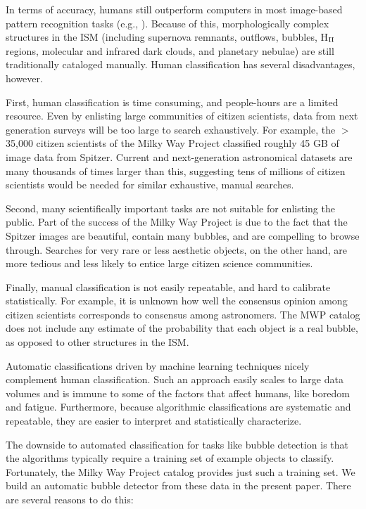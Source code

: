 \documentclass[preprint]{aastex}
\newcommand{\hii}[0]{H$_{\rm II}$}
\begin{document}
In terms of accuracy, humans still outperform computers in most image-based pattern recognition tasks (e.g., \citealt{Zhang10}). Because of this, morphologically complex structures in the ISM (including supernova remnants, outflows, bubbles, \hii\, regions, molecular and infrared dark clouds, and planetary nebulae) are still traditionally cataloged manually. Human classification has several disadvantages, however.

First, human classification is time consuming, and people-hours are a limited resource. Even by enlisting large communities of citizen scientists, data from next generation surveys will be too large to search exhaustively. For example, the $>$ 35,000 citizen scientists of the Milky Way Project classified roughly 45 GB of image data from Spitzer. Current and next-generation astronomical datasets are many thousands of times larger than this, suggesting tens of millions of citizen scientists would be needed for similar exhaustive, manual searches.

Second, many scientifically important tasks are not suitable for enlisting the public. Part of the success of the Milky Way Project is due to the fact that the Spitzer images are beautiful, contain many bubbles, and are compelling to browse through. Searches for very rare or less aesthetic objects, on the other hand, are more tedious and less likely to entice large citizen science communities. 

Finally, manual classification is not easily repeatable, and hard to calibrate statistically. For example, it is unknown how well the consensus opinion among citizen scientists corresponds to consensus among astronomers. The MWP catalog does not include any estimate of the probability that each object is a real bubble, as opposed to other structures in the ISM.

Automatic classifications driven by machine learning techniques nicely complement human classification. Such an approach easily scales to large data volumes and is immune to some of the factors that affect humans, like boredom and fatigue. Furthermore, because algorithmic classifications are systematic and repeatable, they are easier to interpret and statistically characterize. 

The downside to automated classification for tasks like bubble detection is that the algorithms typically require a training set of example objects to classify. Fortunately, the Milky Way Project catalog provides just such a training set. We build an automatic bubble detector from these data in the present paper. There are several reasons to do this:
\end{document}

